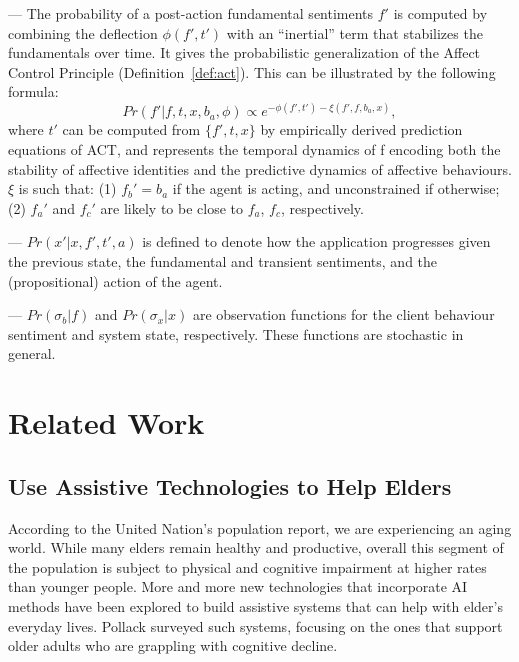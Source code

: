 --- The probability of a post-action fundamental sentiments $f'$ is computed by combining the deflection $\phi(f',t')$ with an ``inertial'' term that stabilizes the fundamentals over time. It gives the probabilistic generalization of the Affect Control Principle (Definition~\ref{def:act}). This can be illustrated by the following formula: \\
\begin{equation*}
Pr(f'|f,t,x,b_{a},\phi) \propto e^{-\phi(f',t')-\xi(f',f,b_{a},x)}, 
\end{equation*}
where $t'$ can be computed from $\{f', t, x\}$ by empirically derived prediction equations of ACT, and represents the temporal dynamics of f encoding both the stability of affective identities and the predictive dynamics of affective behaviours. $\xi$ is such that: (1) $f_{b}' = b_{a}$ if the agent is acting, and unconstrained if otherwise; (2) $f_{a}'$ and $f_{c}'$ are likely to be close to $f_{a}$, $f_{c}$, respectively.

--- $Pr(x'|x,f',t',a)$ is defined to denote how the application progresses given the previous state, the fundamental and transient sentiments, and the (propositional) action of the agent. 

--- $Pr(\sigma_{b}|f)$ and $Pr(\sigma_{x}|x)$ are observation functions for the client behaviour sentiment and system state, respectively. These functions are stochastic in general.

\section{Related Work}
\subsection{Use Assistive Technologies to Help Elders}

According to the United Nation's population report, we are experiencing an aging world. While many elders remain healthy and productive, overall this segment of the population is subject to physical and cognitive impairment at higher rates than younger people. More and more new technologies that incorporate AI methods have been explored to build assistive systems that can help with elder's everyday lives. Pollack \cite{pollack2005intelligent} surveyed such systems, focusing on the ones that support older adults who are grappling with cognitive decline.

